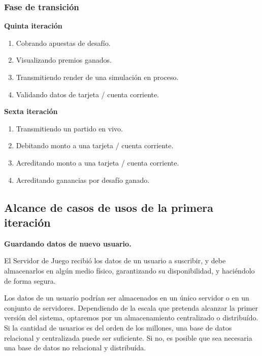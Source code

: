 \documentclass[a4paper, 10pt, twoside]{article}
\begin{document}

\subsubsection{Fase de transición}

\textbf{Quinta iteración}
\begin{enumerate}
\item Cobrando apuestas de desafío.
\item Visualizando premios ganados.
\item Transmitiendo render de una simulación en proceso.
\item Validando datos de tarjeta / cuenta corriente.
\end{enumerate}

\textbf{Sexta iteración}
\begin{enumerate}
\item Transmitiendo un partido en vivo.
\item Debitando monto a una tarjeta / cuenta corriente.
\item Acreditando monto a una tarjeta / cuenta corriente.
\item Acreditando ganancias por desafío ganado.
\end{enumerate}


\subsection{Alcance de casos de usos de la primera iteración}
\textbf{Guardando datos de nuevo usuario.}

El Servidor de Juego recibió los datos de un usuario a suscribir, y debe almacenarlos en algún medio físico, garantizando su disponibilidad, y haciéndolo de forma segura.

Los datos de un usuario podrían ser almacenados en un único servidor o en un conjunto de servidores. Dependiendo de la escala que pretenda alcanzar la primer versión del sistema, optaremos por un almacenamiento centralizado o distribuído. Si la cantidad de usuarios es del orden de los millones, una base de datos relacional y centralizada puede ser suficiente. Si no, es posible que sea necesaria una base de datos no relacional y distribuída.
\end{document}
